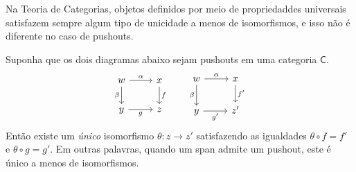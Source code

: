 Na Teoria de Categorias, objetos definidos por meio de propriedaddes universais satisfazem sempre algum tipo de unicidade a menos de isomorfismos, e isso não é diferente no caso de pushouts.

\begin{prop}\label{prop:unicidade_pushout}
    Suponha que os dois diagramas abaixo sejam pushouts em uma categoria $\mathsf{C}$.
    \begin{displaymath}
        \begin{tikzcd}
            w
            \arrow[r, "\alpha"]
            \arrow[d, "\beta" swap]
            & x
            \arrow[d, "f"]
            \\ y
            \arrow[r, "g" swap]
            & z
        \end{tikzcd}
        \qquad
        \begin{tikzcd}
            w
            \arrow[r, "\alpha"]
            \arrow[d, "\beta" swap]
            & x
            \arrow[d, "f'"]
            \\ y
            \arrow[r, "g'" swap]
            & z'
        \end{tikzcd}
    \end{displaymath}
    Então existe um \emph{único} isomorfismo $\theta: z \to z'$ satisfazendo as igualdades $\theta \circ f = f'$ e $\theta \circ g = g'$.
    Em outras palavras, quando um span admite um pushout, este é único a menos de isomorfismos.
\end{prop}

